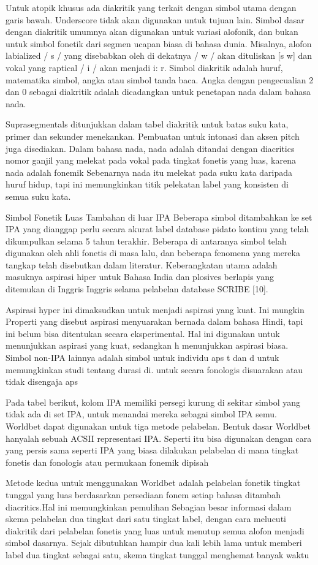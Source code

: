 	Untuk atopik khusus ada diakritik yang terkait dengan simbol utama dengan garis bawah.
	Underscore tidak akan digunakan untuk tujuan lain. Simbol dasar dengan diakritik umumnya akan digunakan untuk variasi alofonik, dan bukan untuk simbol fonetik dari segmen ucapan biasa di bahasa dunia. Misalnya, alofon labialized / s / yang disebabkan oleh di dekatnya / w / akan dituliskan [s w] dan vokal yang raptical / i / akan menjadi i: r. Simbol diakritik adalah huruf, matematika simbol, angka atau simbol tanda baca. Angka dengan pengecualian 2 dan 0 sebagai diakritik adalah dicadangkan untuk penetapan nada dalam bahasa nada.

	Suprasegmentals ditunjukkan dalam tabel diakritik untuk batas suku kata, primer dan sekunder
    menekankan. Pembuatan untuk intonasi dan aksen pitch juga disediakan. Dalam bahasa nada, nada adalah
    ditandai dengan diacritics nomor ganjil yang melekat pada vokal pada tingkat fonetis yang luas, karena nada
    adalah fonemik Sebenarnya nada itu melekat pada suku kata daripada huruf hidup, tapi ini
    memungkinkan titik pelekatan label yang konsisten di semua suku kata.

	Simbol Fonetik Luas Tambahan di luar IPA 
	Beberapa simbol ditambahkan ke set IPA yang dianggap perlu secara akurat
	label database pidato kontinu yang telah dikumpulkan selama 5 tahun terakhir. Beberapa di antaranya
	simbol telah digunakan oleh ahli fonetis di masa lalu, dan beberapa fenomena yang mereka tangkap
	telah disebutkan dalam literatur. Keberangkatan utama adalah masuknya aspirasi hiper untuk
	Bahasa India dan plosives berlapis yang ditemukan di Inggris Inggris selama pelabelan
	database SCRIBE [10]. 

    Aspirasi hyper ini dimaksudkan untuk menjadi aspirasi yang kuat. Ini mungkin
	Properti yang disebut aspirasi menyuarakan bernada dalam bahasa Hindi, tapi ini belum bisa ditentukan secara eksperimental.
	Hal ini digunakan untuk menunjukkan aspirasi yang kuat, sedangkan h menunjukkan aspirasi biasa. Simbol non-IPA lainnya
	adalah simbol untuk individu
	aps t dan d untuk memungkinkan studi tentang durasi di. untuk
	secara fonologis disuarakan atau tidak disengaja
	aps

	Pada tabel berikut, kolom IPA memiliki persegi
	kurung di sekitar simbol yang tidak ada di set IPA, untuk menandai mereka sebagai simbol IPA semu.
	Worldbet dapat digunakan untuk tiga metode pelabelan. Bentuk dasar Worldbet hanyalah sebuah ACSII
	representasi IPA. Seperti itu bisa digunakan dengan cara yang persis sama seperti IPA yang biasa dilakukan
	pelabelan di mana tingkat fonetis dan fonologis atau permukaan fonemik dipisah

	Metode kedua untuk menggunakan Worldbet adalah pelabelan fonetik tingkat tunggal yang luas
  	berdasarkan persediaan fonem setiap bahasa ditambah diacritics.Hal ini memungkinkan pemulihan
	Sebagian besar informasi dalam skema pelabelan dua tingkat dari satu tingkat label, dengan cara melucuti
	diakritik dari pelabelan fonetis yang luas untuk menutup semua alofon menjadi simbol dasarnya. Sejak
	dibutuhkan hampir dua kali lebih lama untuk memberi label dua tingkat sebagai satu, skema tingkat tunggal menghemat banyak
	waktu

